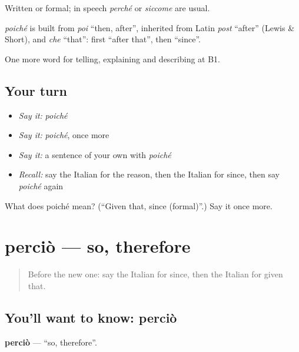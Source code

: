 Written or formal; in speech \emph{perché} or \emph{siccome} are usual.

\begin{cousinweb}
\emph{poiché} is built from \emph{poi} \textquotedblleft{}then, after\textquotedblright{}, inherited from Latin \emph{post} \textquotedblleft{}after\textquotedblright{} (Lewis \& Short), and \emph{che} \textquotedblleft{}that\textquotedblright{}: first \textquotedblleft{}after that\textquotedblright{}, then \textquotedblleft{}since\textquotedblright{}.
\end{cousinweb}

\begin{grammarlens}[title={What you've built}]
One more word for telling, explaining and describing at B1.
\end{grammarlens}

\subsection*{Your turn}
\begin{itemize}
\raggedright
  \item \emph{Say it:} \emph{poiché}
  \item \emph{Say it:} \emph{poiché}, once more
  \item \emph{Say it:} a sentence of your own with \emph{poiché}
  \item \emph{Recall:} say the Italian for the reason, then the Italian for since, then say \emph{poiché} again
\end{itemize}

\begin{tcolorbox}[breakable,colback=teal!4,colframe=teal!35!black,title={Before you move on}]
What does poiché mean? (\textquotedblleft{}Given that, since (formal)\textquotedblright{}.) Say it once more.
\end{tcolorbox}
\section[perciò]{perciò — so, therefore}

\label{lesson:IT-C350-percio}



\begin{quote}
Before the new one: say the Italian for since, then the Italian for given that.
\end{quote}

\subsection*{You'll want to know: perciò}
\textbf{perciò} — \textquotedblleft{}so, therefore\textquotedblright{}.

